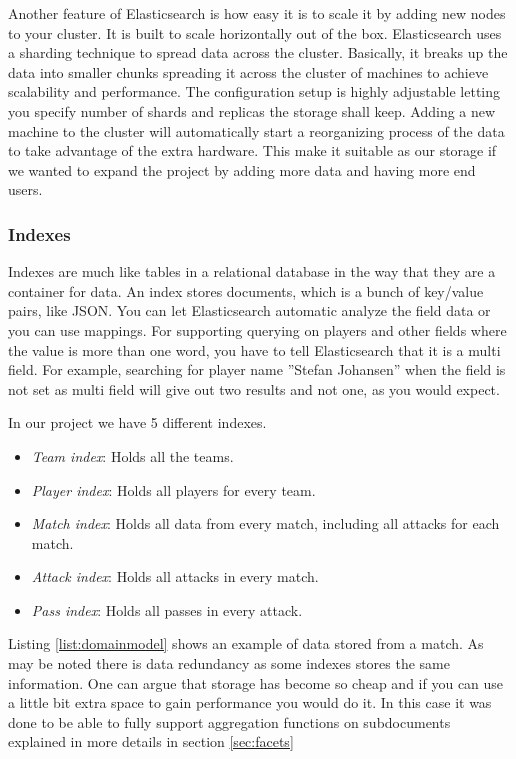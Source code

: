 Another feature of Elasticsearch is how easy it is to scale it by adding new nodes to your cluster. It is built to scale horizontally out of the box. Elasticsearch uses a sharding technique to spread data across the cluster.  Basically, it breaks up the data into smaller chunks spreading it across the cluster of machines to achieve scalability and performance. The configuration setup is highly adjustable letting you specify number of shards and replicas the storage shall keep. Adding a new machine to the cluster will automatically start a reorganizing process of the data to take advantage of the extra hardware. This make it suitable as our storage if we wanted to expand the project by adding more data and having more end users.


\subsubsection{Indexes}

Indexes are much like tables in a relational database in the way that they are a container for data. An index stores documents, which is a bunch of key/value pairs, like \ac{JSON}. You can let Elasticsearch automatic analyze the field data or you can use mappings. For supporting querying on players and other fields where the value is more than one word, you have to tell Elasticsearch that it is a multi field. For example, searching for player name ''Stefan Johansen'' when the field is not set as multi field will give out two results and not one, as you would expect.

In our project we have 5 different indexes. 
\begin{itemize}
\item \emph{Team index}: Holds all the teams.
\item \emph{Player index}: Holds all players for every team.
\item \emph{Match index}: Holds all data from every match, including all attacks for each match.
\item \emph{Attack index}: Holds all attacks in every match.
\item \emph{Pass index}: Holds all passes in every attack.
\end{itemize}

Listing \ref{list:domainmodel} shows an example of data stored from a match. As may be noted there is data redundancy as some indexes stores the same information. One can argue that storage has become so cheap and if you can use a little bit extra space to gain performance you would do it. In this case it was done to be able to fully support aggregation functions on subdocuments explained in more details in section \ref{sec:facets}

